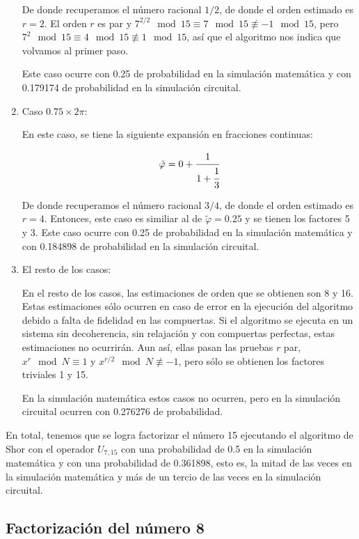 \begin{enumerate}
        De donde recuperamos el número racional $1/2$, de donde el orden estimado es $r = 2$. El orden $r$ es par y $7^{2/2}\mod 15 \equiv 7\mod 15 \not\equiv -1\mod 15$, pero $7^2\mod 15 \equiv 4\mod 15 \not\equiv 1\mod 15$, así que el algoritmo nos indica que volvamos al primer paso.

        Este caso ocurre con 0.25 de probabilidad en la simulación matemática y con 0.179174 de probabilidad en la simulación circuital.

    \item Caso $0.75 \times 2\pi$:

        En este caso, se tiene la siguiente expansión en fracciones continuas:

        \begin{equation}
            \tilde{\varphi} = 0 + \cfrac{1}{1 + \cfrac{1}{3}}
        \end{equation}
        
        De donde recuperamos el número racional $3/4$, de donde el orden estimado es $r = 4$. Entonces, este caso es similiar al de $\tilde{\varphi} = 0.25$ y se tienen los factores 5 y 3. Este caso ocurre con 0.25 de probabilidad en la simulación matemática y con 0.184898 de probabilidad en la simulación circuital.

    \item El resto de los casos:

        En el resto de los casos, las estimaciones de orden que se obtienen son 8 y 16. Estas estimaciones sólo ocurren en caso de error en la ejecución del algoritmo debido a falta de fidelidad en las compuertas. Si el algoritmo se ejecuta en un sistema sin decoherencia, sin relajación y con compuertas perfectas, estas estimaciones no ocurrirán. Aun así, ellas pasan las pruebas $r$ par, $x^r \mod N \equiv 1$ y $x^{r/2} \mod N \not\equiv -1$, pero sólo se obtienen los factores triviales 1 y 15.

        En la simulación matemática estos casos no ocurren, pero en la simulación circuital ocurren con 0.276276 de probabilidad.
\end{enumerate}

En total, tenemos que se logra factorizar el número 15 ejecutando el algoritmo de Shor con el operador $U_{7,15}$ con una probabilidad de 0.5 en la simulación matemática y con una probabilidad de 0.361898, esto es, la mitad de las veces en la simulación matemática y más de un tercio de las veces en la simulación circuital.

\subsection{Factorización del número 8}


